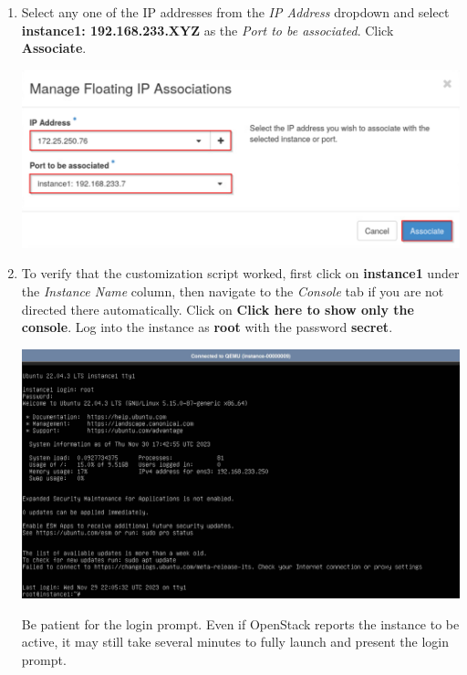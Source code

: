 \documentclass[letterpaper, 12pt]{article}
\begin{document}
\begin{enumerate}
    \item Select any one of the IP addresses from the \textit{IP Address} dropdown and select
    \textbf{instance1: 192.168.233.XYZ} as the \textit{Port to be associated}. Click \textbf{Associate}.

    \begin{center}
        \includegraphics[width=\linewidth]{images/part2/step12.png}
    \end{center}

    \item To verify that the customization script worked, first click on \textbf{instance1} under the
    \textit{Instance Name} column, then navigate to the \textit{Console} tab if you are not directed there
    automatically. Click on \textbf{Click here to show only the console}. Log into the instance as \textbf{root} with
    the password \textbf{secret}.

    \begin{center}
        \includegraphics[width=\linewidth]{images/part2/step13.png}
    \end{center}

    \begin{notebox}
        Be patient for the login prompt. Even if OpenStack reports the instance to be active, it may still take several
        minutes to fully launch and present the login prompt.
    \end{notebox}


\end{enumerate}
\end{document}
